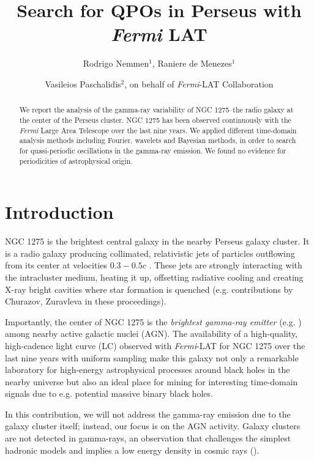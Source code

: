 \documentclass{iau}
\title[Search for $\gamma$-ray QPOs in Perseus] %
{Search for QPOs in Perseus with \textit{Fermi} LAT}
\author[Nemmen, de Menezes \& Paschalidis]   %
{Rodrigo Nemmen$^1$, Raniere de Menezes$^1$
 \and Vasileios Paschalidis$^2$, on behalf of \textit{Fermi}-LAT Collaboration}
\affiliation{$^1$Universidade de S\~ao Paulo, Instituto de Astronomia, Geof\'{\i}sica e Ci\^encias Atmosf\'ericas, Departamento de Astronomia,\\ S\~ao Paulo, SP 05508-090, Brazil \\ email: {\tt rodrigo.nemmen@iag.usp.br} \\[\affilskip]
$^2$Depts. of Astronomy \& Physics, University of Arizona}
\begin{document}
\maketitle

\begin{abstract}
We report the analysis of the gamma-ray variability of NGC 1275--the radio galaxy at the center of the Perseus cluster. NGC 1275 has been observed continuously with the \textit{Fermi} Large Area Telescope over the last nine years. We applied different time-domain analysis methods including Fourier, wavelets and Bayesian methods, in order to search for quasi-periodic oscillations in the gamma-ray emission. We found no evidence for periodicities of astrophysical origin. 
\end{abstract}

\firstsection %
\section{Introduction}

NGC 1275 is the brightest central galaxy in the nearby Perseus galaxy cluster. It is a radio galaxy producing collimated, relativistic jets of particles outflowing from its center at velocities $0.3-0.5c$ \cite[(Walker, Romney \& Benson 1994)]{Walker1994}. These jets are strongly interacting with the intracluster medium, heating it up, offsetting radiative cooling and creating X-ray bright cavities where star formation is quenched (e.g. contributions by Churazov, Zuravleva in these proceedings). 

Importantly, the center of NGC 1275 is the \textit{brightest gamma-ray emitter} (e.g. \cite[Abdo et al. 2009]{ngc1275LAT}) among nearby active galactic nuclei (AGN). The availability of a high-quality, high-cadence light curve (LC) observed with \textit{Fermi}-LAT for NGC 1275 over the last nine years with uniform sampling make this galaxy not only a remarkable laboratory for high-energy astrophysical processes around black holes in the nearby universe but also an ideal place for mining for interesting time-domain signals due to e.g. potential massive binary black holes. 

In this contribution, we will not address the gamma-ray emission due to the galaxy cluster itself; instead, our focus is on the AGN activity. Galaxy clusters are not detected in gamma-rays, an observation that challenges the simplest hadronic models and implies a low energy density in cosmic rays (\cite[Ackermann et al. 2014]{Ackermann2014}). 
\end{document}
